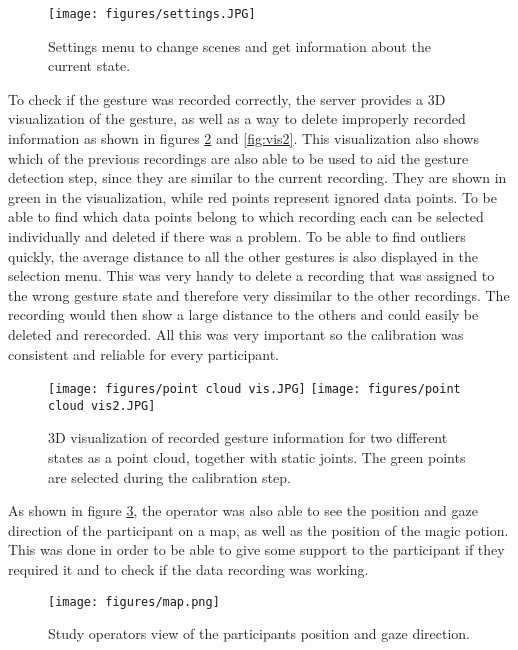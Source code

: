 \begin{figure}[!ht]
    \centering
    \texttt{[image: figures/settings.JPG]}
    \caption{Settings menu to change scenes and get information about the current state.}
    \label{fig:settings}
\end{figure}

To check if the gesture was recorded correctly, the server provides a 3D visualization of the gesture, as well as a way to delete improperly recorded information as shown in figures \ref{fig:vis} and  \ref{fig:vis2}. This visualization also shows which of the previous recordings are also able to be used to aid the gesture detection step, since they are similar to the current recording. They are shown in green in the visualization, while red points represent ignored data points. To be able to find which data points belong to which recording each can be selected individually and deleted if there was a problem. To be able to find outliers quickly, the average distance to all the other gestures is also displayed in the selection menu. This was very handy to delete a recording that was assigned to the wrong gesture state and therefore very dissimilar to the other recordings. The recording would then show a large distance to the others and could easily be deleted and rerecorded. All this was very important so the calibration was consistent and reliable for every participant.

\begin{figure}[!htb]
        \texttt{[image: figures/point cloud vis.JPG]}
        \label{fig:vis2}
    \endminipage\hfill
        \texttt{[image: figures/point cloud vis2.JPG]}
        \label{fig:vis}
    \endminipage\hfill
    \caption{3D visualization of recorded gesture information for two different states as a point cloud, together with static joints. The green points are selected during the calibration step.}
\end{figure}

As shown in figure \ref{fig:map}, the operator was also able to see the position and gaze direction of the participant on a map, as well as the position of the magic potion. This was done in order to be able to give some support to the participant if they required it and to check if the data recording was working. 

\begin{figure}[!ht]
    \centering
    \texttt{[image: figures/map.png]}
    \caption{Study operators view of the participants position and gaze direction.}
    \label{fig:map}
\end{figure}

